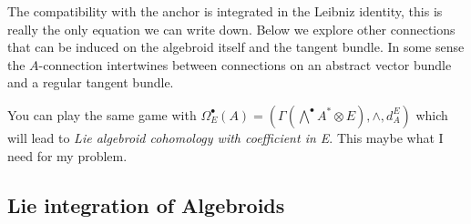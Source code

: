 The compatibility with the anchor is integrated in the Leibniz identity, this is really the only equation we can write down. Below we explore other connections that can be induced on the algebroid itself and the tangent bundle. In some sense the $A$-connection intertwines between connections on an abstract vector bundle and a regular tangent bundle.
% 
\label{def:Curvature of Lie algebroid connection}

You can play the same game with $\Omega_E^\bullet(A) = (\Gamma(\bigwedge^{\bullet} A^{*} \otimes E), \wedge, d_A^E)$ which will lead to \textit{Lie algebroid cohomology with coefficient in E}. This maybe what I need for my problem.
\subsection{Lie integration of Algebroids} %
\label{sub:lie_integration_of_algebroids}





